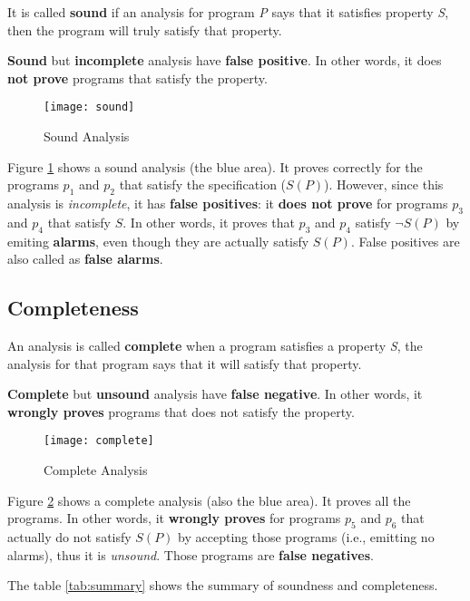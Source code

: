 It is called \textbf{sound} if an analysis for program \textsl{P} says
that it satisfies property \textsl{S}, then the program will truly
satisfy that property.

\textbf{Sound} but \textbf{incomplete} analysis have \textbf{false
  positive}. In other words, it does \textbf{not prove} programs that
satisfy the property.

\begin{figure}[h]
  \texttt{[image: sound]}
  \caption{Sound Analysis}
  \label{fig:sound}
\end{figure}

Figure \ref{fig:sound} shows a sound analysis (the blue area). It
proves correctly for the programs $ p_1 $ and $ p_2 $ that satisfy the
specification ($S(P)$). However, since this analysis is
\textit{incomplete}, it has \textbf{false positives}: it \textbf{does
  not prove} for programs $ p_3 $ and $ p_4 $ that satisfy $S$. In
other words, it proves that $ p_3 $ and $ p_4 $ satisfy $ \neg S(P) $
by emiting \textbf{alarms}, even though they are actually satisfy
$ S(P) $. False positives are also called as \textbf{false alarms}.

\subsection{Completeness}

An analysis is called \textbf{complete} when a program satisfies a
property \textsl{S}, the analysis for that program says that it will
satisfy that property.


\textbf{Complete} but \textbf{unsound} analysis have \textbf{false
  negative}. In other words, it \textbf{wrongly proves} programs that
does not satisfy the property.


\begin{figure}[h]
  \texttt{[image: complete]}
  \caption{Complete Analysis}
  \label{fig:complete}
\end{figure}

Figure \ref{fig:complete} shows a complete analysis (also the blue
area). It proves all the programs. In other words, it \textbf{wrongly
  proves} for programs $ p_5 $ and $ p_6 $ that actually do not
satisfy $ S(P) $ by accepting those programs (i.e., emitting no
alarms), thus it is \textit{unsound}. Those programs are \textbf{false
  negatives}.


The table \ref{tab:summary} shows the summary of soundness and
completeness.

